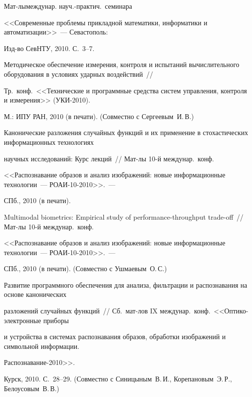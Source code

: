 Мат-лы\linebreak междунар. науч.-практич.\ семинара


<<Современные проблемы прикладной математики, информатики и автоматизации>>~--- Севастополь:


Изд-во СевНТУ, 2010. С.~3--7.





Методическое обеспечение измерения, контроля и испытаний вычислительного оборудования в условиях ударных воздействий~//


Тр.\ конф.\ <<Технические и программные средства систем управления, контроля и измерения>> (УКИ-2010).


М.: ИПУ РАН, 2010 (в печати). (Совместно с Сергеевым~И.\,В.)





Канонические разложения случайных функций и их применение в стохастических информационных технологиях


научных исследований: Курс лекций~// Мат-лы 10-й междунар.\ конф.\


<<Распознавание образов и анализ изображений: новые информационные технологии~--- РОАИ-10-2010>>.~---


СПб., 2010 (в печати).





Multimodal biometrics: Empirical study of performance-\linebreak throughput trade-off~// Мат-лы 10-й междунар.\ конф.\


<<Распознавание образов и анализ изображений: новые информационные технологии~--- РОАИ-10-2010>>.~---


СПб., 2010 (в печати). (Совместно с Ушмаевым~О.\,С.)





Развитие программного обеспечения для анализа, фильтрации и распознавания на основе канонических


разложений случайных функций~// Сб.\ мат-лов IX междунар.\ конф.\ <<Оптико-электронные приборы


и устройства в системах распознавания образов, обработки изображений и символьной информации.\linebreak


 Рас\-по\-зна\-ва\-ние-2010>>.


Курск, 2010. С.~28--29. (Совместно с Синицыным~В.\,И., Корепановым~Э.\,Р., Белоусовым~В.\,В.)





